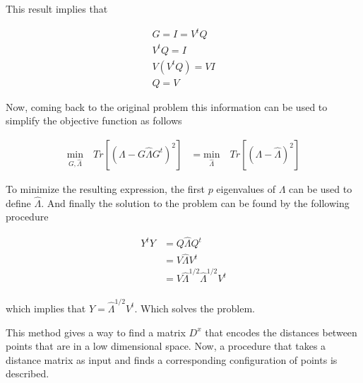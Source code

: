 \documentclass[12pt,journal]{IEEEtran}
\begin{document}
    This result implies that

    \begin{equation*}
        \begin{aligned}
        G = I = V^tQ\\
        V^tQ = I\\
        V(V^tQ) = VI\\
        Q = V
        \end{aligned}
    \end{equation*}

    Now, coming back to the original problem this information can be used to
    simplify the objective function as follows

    \begin{equation*}
        \begin{aligned}
            \underset{G,\hat{\Lambda}}{\text{min}} \quad Tr[(\Lambda - G \hat{\Lambda} G^t)^2]
            &=
            \underset{\hat{\Lambda}}{\text{min}} \quad Tr[(\Lambda - \hat{\Lambda})^2]
        \end{aligned}
    \end{equation*}

    To minimize the resulting expression, the first $p$ eigenvalues of $\Lambda$
    can be used to define $\hat{\Lambda}$. And finally the solution to the
    problem can be found by the following procedure

    \begin{equation*}
        \begin{aligned}
            Y^tY &= Q \hat{\Lambda} Q^t\\
            &=
            V \hat{\Lambda} V^t\\
            &=
            V \hat{\Lambda}^{1/2} \hat{\Lambda}^{1/2} V^t\\
        \end{aligned}
    \end{equation*}

    which implies that $Y = \hat{\Lambda}^{1/2} V^t$. Which solves the problem.

    \vspace{0.25cm}

    This method gives a way to find a matrix $D^x$ that encodes the distances
    between points that are in a low dimensional space. Now, a procedure that
    takes a distance matrix as input and finds a corresponding configuration
    of points is described.

    \vspace{0.25cm}
\end{document}
